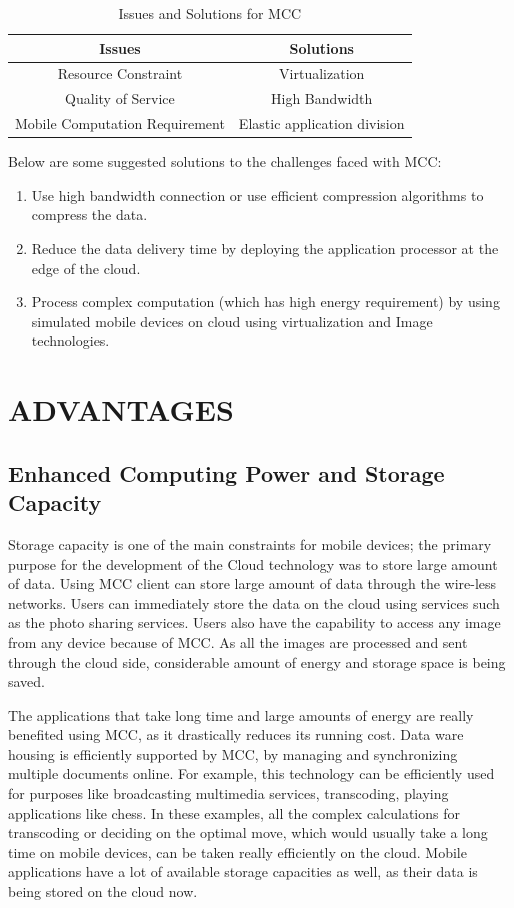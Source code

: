 \documentclass[10pt, conference, compsocconf]{IEEEtran}
\begin{document}
\begin{table}[h]
\caption{Issues and Solutions for MCC}
\label{table_example}
\begin{center}
\begin{tabular}{|c||c|}
\hline
\textbf{Issues} & \textbf{Solutions}\\
\hline
Resource Constraint & Virtualization\\
\hline
Quality of Service & High Bandwidth\\
\hline
Mobile Computation Requirement & Elastic application division\\
\hline
\end{tabular}
\end{center}
\end{table}


Below are some suggested solutions to the challenges faced with MCC:

\begin{enumerate}
\item Use high bandwidth connection or use efficient compression algorithms to compress the data.
\item Reduce the data delivery time by deploying the application processor at the edge of the cloud.
\item Process complex computation (which has high energy requirement) by using simulated mobile devices on cloud using virtualization and Image technologies.
\end{enumerate}

\section{ADVANTAGES}
\subsection{Enhanced Computing Power and Storage Capacity}
Storage capacity is one of the main constraints for mobile devices; the primary purpose for the development of the Cloud technology was to store large amount of data. Using MCC client can store large amount of data through the wire-less networks. Users can immediately store the data on the cloud using services such as the photo sharing services. Users also have the capability to access any image from any device because of MCC. As all the images are processed and sent through the cloud side, considerable amount of energy and storage space is being saved.


The applications that take long time and large amounts of energy are really benefited using MCC, as it drastically reduces its running cost. Data ware housing is efficiently supported by MCC, by managing and synchronizing multiple documents online. For example, this technology can be efficiently used for purposes like broadcasting multimedia services, transcoding, playing applications like chess. In these examples, all the complex calculations for transcoding or deciding on the optimal move, which would usually take a long time on mobile devices, can be taken really efficiently on the cloud. Mobile applications have a lot of available storage capacities as well, as their data is being stored on the cloud now.
\end{document}
